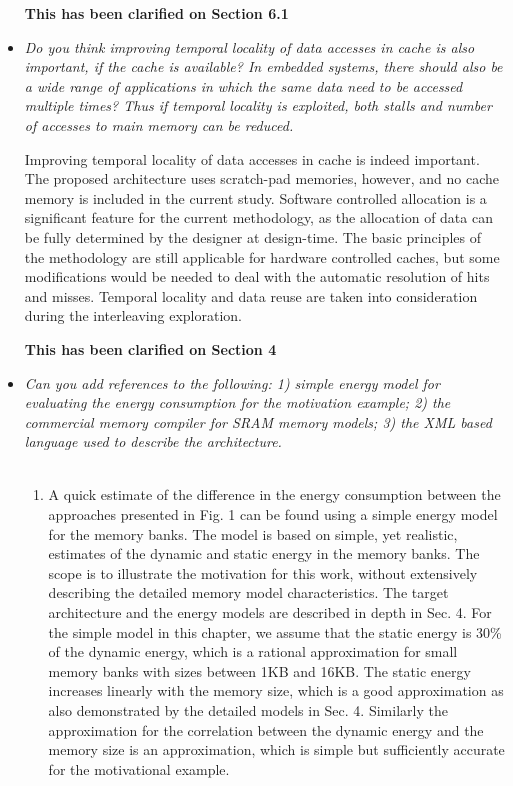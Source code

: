 \documentclass[12pt,a4paper,notitlepage]{article}
\begin{document}
\begin{itemize}
\textbf{This has been clarified on Section 6.1}

\item \textit{Do you think improving temporal locality of data accesses in cache is also important, if the cache is available? In embedded systems, there should also be a wide range of applications in which the same data need to be accessed multiple times? Thus if temporal locality is exploited, both stalls and number of accesses to main memory can be reduced.}

Improving temporal locality of data accesses in cache is indeed important. 
The proposed architecture uses scratch-pad memories, however, and no cache memory is included in the current study.
Software controlled allocation is a significant feature for the current methodology, as the allocation of data can be fully determined by the designer at design-time.
The basic principles of the methodology are still applicable for hardware controlled caches, but some modifications would be needed to deal with the automatic resolution of hits and misses.
Temporal locality and data reuse are taken into consideration during the interleaving exploration.

\textbf{This has been clarified on Section 4}

\item \textit{Can you add references to the following: 1) simple energy model for evaluating the energy consumption for the motivation example; 2) the commercial memory compiler for SRAM memory models; 3) the XML based language used to describe the architecture.}
\\
\\
\begin{enumerate}
\item A quick estimate of the difference in the energy consumption between the approaches presented in Fig. 1 can be found using a simple energy model for the memory banks. 
The model is based on simple, yet realistic, estimates of the dynamic and static energy in the memory banks.
The scope is to illustrate the motivation for this work, without extensively describing the detailed memory model characteristics. 
The target architecture and the energy models are described in depth in Sec. 4. 
For the simple model in this chapter, we assume that the static energy is 30\% of the dynamic energy, which is a rational approximation for small memory banks with sizes between 1KB and 16KB.
The static energy increases linearly with the memory size, which is a good approximation as also demonstrated by the detailed models in Sec. 4.
Similarly the approximation for the correlation between the dynamic energy and the memory size is an approximation, which is simple but sufficiently accurate for the motivational example.


\end{enumerate}
\end{itemize}
\end{document}
